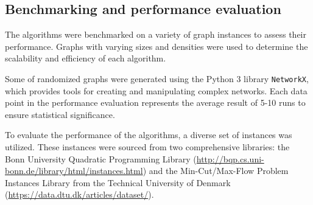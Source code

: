 \subsection{Benchmarking and performance evaluation}

The algorithms were benchmarked on a variety of graph instances to assess their performance. Graphs with varying sizes and densities were used to determine the scalability and efficiency of each algorithm.

Some of randomized graphs were generated using the Python 3 library \texttt{NetworkX}, which provides tools for creating and manipulating complex networks. Each data point in the performance evaluation represents the average result of 5-10 runs to ensure statistical significance.

To evaluate the performance of the algorithms, a diverse set of instances was utilized. These instances were sourced from two comprehensive libraries: the Bonn University Quadratic Programming Library (\url{http://bqp.cs.uni-bonn.de/library/html/instances.html}) and the Min-Cut/Max-Flow Problem Instances Library from the Technical University of Denmark (\url{https://data.dtu.dk/articles/dataset/}).